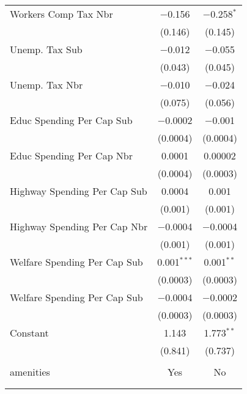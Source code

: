 \begin{table}[!htbp]
\begin{tabular}{@{\extracolsep{5pt}}lcc}
  Workers Comp Tax Nbr & $-$0.156 & $-$0.258$^{*}$ \\ 
  & (0.146) & (0.145) \\ 
  Unemp. Tax Sub & $-$0.012 & $-$0.055 \\ 
  & (0.043) & (0.045) \\ 
  Unemp. Tax Nbr & $-$0.010 & $-$0.024 \\ 
  & (0.075) & (0.056) \\ 
  Educ Spending Per Cap Sub & $-$0.0002 & $-$0.001 \\ 
  & (0.0004) & (0.0004) \\ 
  Educ Spending Per Cap Nbr & 0.0001 & 0.00002 \\ 
  & (0.0004) & (0.0003) \\ 
  Highway Spending Per Cap Sub & 0.0004 & 0.001 \\ 
  & (0.001) & (0.001) \\ 
  Highway Spending Per Cap Nbr & $-$0.0004 & $-$0.0004 \\ 
  & (0.001) & (0.001) \\ 
  Welfare Spending Per Cap Sub & 0.001$^{***}$ & 0.001$^{**}$ \\ 
  & (0.0003) & (0.0003) \\ 
  Welfare Spending Per Cap Sub & $-$0.0004 & $-$0.0002 \\ 
  & (0.0003) & (0.0003) \\ 
  Constant & 1.143 & 1.773$^{**}$ \\ 
  & (0.841) & (0.737) \\ 
 \hline \\[-1.8ex] 
amenities & Yes & No \\ 
\hline \\[-1.8ex] 
\hline 
\hline \\[-1.8ex] 
\end{tabular} 
\end{table} 
